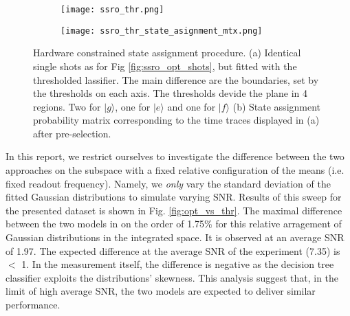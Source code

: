 \begin{figure}[ht]
  \centering
  \begin{subfigure}[t]{0.50\textwidth}
     \centering 
     \texttt{[image: ssro\_thr.png]}
     \caption{ }
     \label{fig:ssro_thr_shots}
  \end{subfigure}
  \hspace{5pt}
  \begin{subfigure}[t]{0.42\textwidth}
     \centering 
     \texttt{[image: ssro\_thr\_state\_asignment\_mtx.png]}
     \caption{ }
     \label{fig:ssro_thr_state_asignment_mtx}
  \end{subfigure}
   \caption{Hardware constrained state assignment procedure. (a) Identical single shots as for Fig \ref{fig:ssro_opt_shots}, but fitted with the thresholded lassifier. The main difference are the boundaries, set by the thresholds on each axis. The thresholds devide the plane in 4 regions. Two for $|g\rangle$, one for $|e\rangle$ and one for $|f\rangle$  (b) State assignment probability matrix corresponding to the time traces displayed in (a) after pre-selection. }
  \label{fig:ssro_thr}
\end{figure}

In this report, we restrict ourselves to investigate the difference between the two approaches on the subspace with a fixed relative configuration of the means (i.e. fixed readout frequency). Namely, we \textit{only} vary the standard deviation of the fitted Gaussian distributions to simulate varying SNR. Results of this sweep for the presented dataset is shown in Fig. \ref{fig:opt_vs_thr}. The maximal difference between the two models in on the order of 1.75\% for this relative arragement of Gaussian distributions in the integrated space. It is observed at an average SNR of 1.97. The expected difference at the average SNR of the experiment (7.35) is $<$ 1\textperthousand. In the measurement itself, the difference is negative as the decision tree classifier exploits the distributions' skewness. This analysis suggest that, in the limit of high average SNR, the two models are expected to deliver similar performance.

